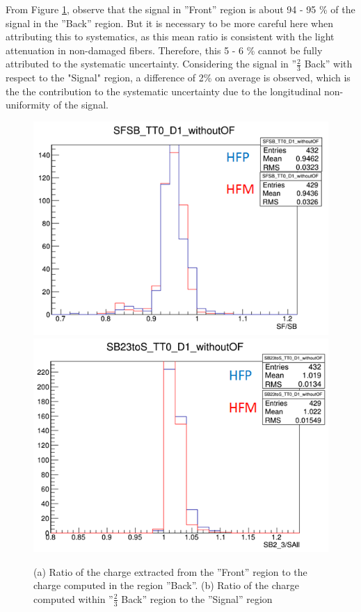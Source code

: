 From Figure \ref{fig:HF_LongUni}, observe that the signal in ''Front'' region is about 94 - 95 \% of the signal in the ''Back'' region. But it is necessary to be more careful here when attributing this to systematics, as this mean ratio is consistent with the light attenuation in non-damaged fibers. Therefore, this 5 - 6 \% cannot be fully attributed to the systematic uncertainty. Considering the signal in ''$\frac{2}{3}$ Back'' with respect to the "Signal" region, a difference of 2\% on average is observed, which is the the contribution to the systematic uncertainty due to the longitudinal non-uniformity of the signal.
\begin{figure}[htb]
    \centering
    \includegraphics[width=.45\textwidth]{figures/ch_hfcalibration/SFSB_D1_woOF.png}
    \includegraphics[width=.45\textwidth]{figures/ch_hfcalibration/SB23toS_D1_woOF.png}
    \caption{(a) Ratio of the charge extracted from the ''Front'' region to the charge computed in the region ''Back''. (b) Ratio of the charge computed within ''$\frac{2}{3}$ Back'' region to the ''Signal'' region}
    \label{fig:HF_LongUni}
\end{figure}

